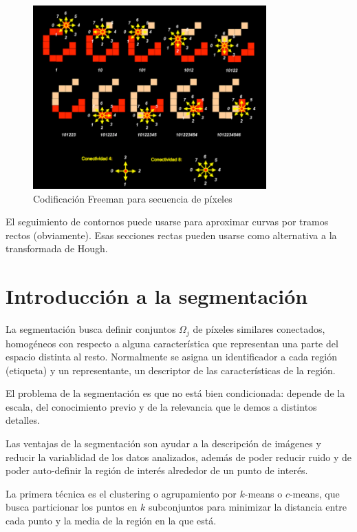 \documentclass[nochap,palatino]{apuntes}
\begin{document}
\begin{figure}[hbtp]
\centering
\includegraphics[width=0.8\textwidth]{img/Freeman.png}
\caption{Codificación Freeman para secuencia de píxeles}
\label{fig:Freeman}
\end{figure}

El seguimiento de contornos puede usarse para aproximar curvas por tramos rectos (obviamente). Esas secciones rectas pueden usarse como alternativa a la transformada de Hough.

\section{Introducción a la segmentación}

La segmentación busca definir conjuntos $Ω_j$ de píxeles similares conectados, homogéneos con respecto a alguna característica que representan una parte del espacio distinta al resto. Normalmente se asigna un identificador a cada región (etiqueta) y un representante, un descriptor de las características de la región.

El problema de la segmentación es que no está bien condicionada: depende de la escala, del conocimiento previo y de la relevancia que le demos a distintos detalles.

Las ventajas de la segmentación son ayudar a la descripción de imágenes y reducir la variablidad de los datos analizados, además de poder reducir ruido y de poder auto-definir la región de interés alrededor de un punto de interés.

La primera técnica es el clustering o agrupamiento por $k$-means o $c$-means, que busca particionar los puntos en $k$ subconjuntos para minimizar la distancia entre cada punto y la media de la región en la que está.
\end{document}
